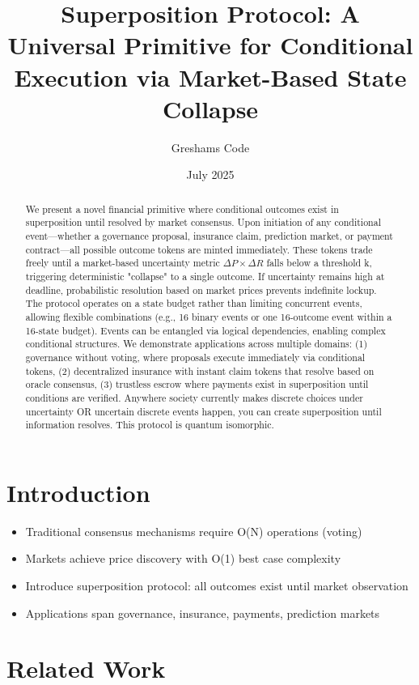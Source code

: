 \documentclass{article}
\title{Superposition Protocol: A Universal Primitive for Conditional Execution via Market-Based State Collapse}
\author[1]{Greshams Code}
\affil[1]{Founder, \href{https://govex.ai}{Govex.ai}}
\date{July 2025}
\begin{document}
\maketitle

\begin{abstract}
We present a novel financial primitive where conditional outcomes exist in superposition until resolved by market consensus. Upon initiation of any conditional event—whether a governance proposal, insurance claim, prediction market, or payment contract—all possible outcome tokens are minted immediately. These tokens trade freely until a market-based uncertainty metric $\Delta P \times \Delta R$ falls below a threshold k, triggering deterministic "collapse" to a single outcome. If uncertainty remains high at deadline, probabilistic resolution based on market prices prevents indefinite lockup.
The protocol operates on a state budget rather than limiting concurrent events, allowing flexible combinations (e.g., 16 binary events or one 16-outcome event within a 16-state budget). Events can be entangled via logical dependencies, enabling complex conditional structures.
We demonstrate applications across multiple domains: (1) governance without voting, where proposals execute immediately via conditional tokens, (2) decentralized insurance with instant claim tokens that resolve based on oracle consensus, (3) trustless escrow where payments exist in superposition until conditions are verified. Anywhere society currently makes discrete choices under uncertainty OR uncertain discrete events happen, you can create superposition until information resolves. This protocol is quantum isomorphic.
\end{abstract}


\section{Introduction}
\begin{itemize}
   \item Traditional consensus mechanisms require O(N) operations (voting)
   \item Markets achieve price discovery with O(1) best case complexity
   \item Introduce superposition protocol: all outcomes exist until market observation
   \item Applications span governance, insurance, payments, prediction markets
\end{itemize}

\section{Related Work}
\end{document}
